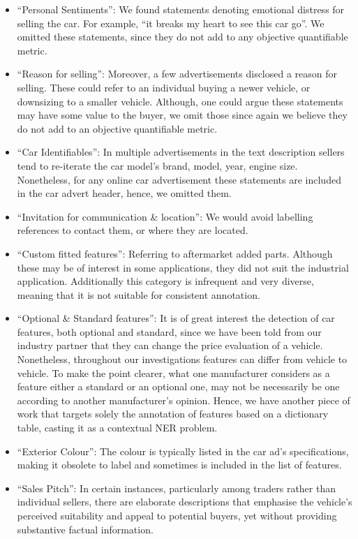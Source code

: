 \documentclass[11pt]{article}
\begin{document}
\begin{itemize}
    \item ``Personal Sentiments'': We found statements denoting emotional distress for selling the car. For example, ``it breaks my heart to see this car go''. We omitted these statements, since they do not add to any objective quantifiable metric.
    \item ``Reason for selling'': Moreover, a few advertisements disclosed a reason for selling. These could refer to an individual buying a newer vehicle, or downsizing to a smaller vehicle. Although, one could argue these statements may have some value to the buyer, we omit those since again we believe they do not add to an objective quantifiable metric.
    \item ``Car Identifiables'': In multiple advertisements in the text description sellers tend to re-iterate the car model's brand, model, year, engine size. Nonetheless, for any online car advertisement these statements are included in the car advert header, hence, we omitted them.
    \item ``Invitation for communication \& location'': We would avoid labelling references to contact them, or where they are located.
    \item ``Custom fitted features'': Referring to aftermarket added parts. Although these may be of interest in some applications, they did not suit the industrial application. Additionally this category is infrequent and very diverse, meaning that it is not suitable for consistent annotation. 
    \item ``Optional \& Standard features'': It is of great interest the detection of car features, both optional and standard, since we have been told from our industry partner that they can change the price evaluation of a vehicle. Nonetheless, throughout our investigations features can differ from vehicle to vehicle. To make the point clearer, what one manufacturer considers as a feature either a standard or an optional one, may not be necessarily be one according to another manufacturer's opinion. Hence, we have another piece of work that targets solely the annotation of features based on a dictionary table, casting it as a contextual NER problem. 
    \item ``Exterior Colour'': The colour is typically listed in the car ad's specifications, making it obsolete to label and sometimes is included in the list of features.
    \item ``Sales Pitch'': In certain instances, particularly among traders rather than individual sellers, there are elaborate descriptions that emphasise the vehicle's perceived suitability and appeal to potential buyers, yet without providing substantive factual information.
    
    \end{itemize}
\end{document}
